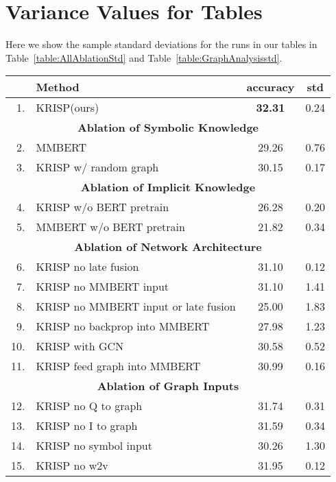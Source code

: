 \documentclass[final]{cvpr}
\providecommand{\ModelName}{KRISP\xspace}
\providecommand{\MMBERTAbr}{MMBERT\xspace}
\begin{document}
\section{Variance Values for Tables}
\label{appx:variance}
Here we show the sample standard deviations for the runs in our tables in Table~\ref{table:AllAblationStd} and Table~\ref{table:GraphAnalysisstd}.

\begin{table*}[h]
\begin{center}
\begin{tabular}{@{}rlcc@{}}
\toprule
&Method & accuracy & std\\ \midrule
1. & \ModelName (ours) & \bf{32.31}  & 0.24 \\
\hline
\multicolumn{4}{c}{\textbf{Ablation of Symbolic Knowledge}}\\
2. & \MMBERTAbr & 29.26  & 0.76 \\
3. & \ModelName w/ random graph & 30.15  & 0.17  \\
\hline
\multicolumn{4}{c}{\textbf{Ablation of Implicit Knowledge}}\\
4. & \ModelName  w/o BERT pretrain & 26.28  & 0.20  \\
5. & \MMBERTAbr w/o BERT pretrain & 21.82  & 0.34  \\
\hline
\multicolumn{4}{c}{\textbf{Ablation of Network Architecture}}\\
6. & \ModelName no late fusion & 31.10 & 0.12  \\
7. & \ModelName no \MMBERTAbr input & 31.10 & 1.41  \\
8. & \ModelName no \MMBERTAbr input or late fusion & 25.00 & 1.83 \\
9. & \ModelName no backprop into \MMBERTAbr & 27.98 & 1.23 \\
10. & \ModelName with GCN & 30.58 & 0.52  \\
11. & \ModelName feed graph into \MMBERTAbr & 30.99 & 0.16  \\
\hline
\multicolumn{4}{c}{\textbf{Ablation of Graph Inputs}}\\
12. & \ModelName no Q to graph & 31.74 & 0.31 \\
13. & \ModelName no I to graph & 31.59 & 0.34 \\
14. & \ModelName no symbol input & 30.26 & 1.30 \\
15. & \ModelName no w2v & 31.95 & 0.12 \\
\bottomrule
\end{tabular}
\end{center}
\caption{\ModelName ablation on OK-VQA v1.1, with sample standard deviations. Mirrors Table~\ref{table:AllAblation} in the main text.}
\label{table:AllAblationStd}
\end{table*}
\end{document}
